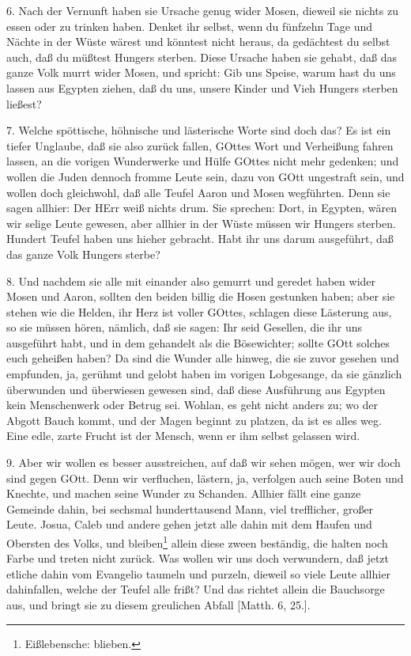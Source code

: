 6. Nach der Vernunft haben sie Ursache genug wider Mosen, dieweil sie nichts zu essen oder zu trinken haben. Denket ihr selbst, wenn du fünfzehn Tage und Nächte in der Wüste wärest und könntest nicht heraus, da gedächtest du selbst auch, daß du müßtest Hungers sterben. Diese Ursache haben sie gehabt, daß das ganze Volk murrt wider Mosen, und spricht: Gib uns Speise, warum hast du uns lassen aus Egypten ziehen, daß du uns, unsere Kinder und Vieh Hungers sterben ließest?

7. Welche spöttische, höhnische und lästerische Worte sind doch das? Es ist ein tiefer Unglaube, daß sie also zurück fallen, GOttes Wort und Verheißung fahren lassen, an die vorigen Wunderwerke und Hülfe GOttes nicht mehr gedenken; und wollen die Juden dennoch fromme Leute sein, dazu von GOtt ungestraft sein, und wollen doch gleichwohl, daß alle Teufel Aaron und Mosen wegführten. Denn sie sagen allhier: Der HErr weiß nichts drum. Sie sprechen: Dort, in Egypten, wären wir selige Leute gewesen, aber allhier in der Wüste müssen wir Hungers sterben. Hundert Teufel haben uns hieher gebracht. Habt ihr uns darum ausgeführt, daß das ganze Volk Hungers sterbe?

8. Und nachdem sie alle mit einander also gemurrt und geredet haben wider Mosen und Aaron, sollten den beiden billig die Hosen gestunken haben; aber sie stehen wie die Helden, ihr Herz ist voller GOttes, schlagen diese Lästerung aus, so sie müssen hören, nämlich, daß sie sagen: Ihr seid Gesellen, die ihr uns ausgeführt habt, und in dem gehandelt als die Bösewichter; sollte GOtt solches euch geheißen haben? Da sind die Wunder alle hinweg, die sie zuvor gesehen und empfunden, ja, gerühmt und gelobt haben im vorigen Lobgesange, da sie gänzlich überwunden und überwiesen gewesen sind, daß diese Ausführung aus Egypten kein Menschenwerk oder Betrug sei. Wohlan, es geht nicht anders zu; wo der Abgott Bauch kommt, und der Magen beginnt zu platzen, da ist es alles weg. Eine edle, zarte Frucht ist der Mensch, wenn er ihm selbst gelassen wird.

9. Aber wir wollen es besser ausstreichen, auf daß wir sehen mögen, wer wir doch sind gegen GOtt. Denn wir verfluchen, lästern, ja, verfolgen auch seine Boten und Knechte, und machen seine Wunder zu Schanden. Allhier fällt eine ganze Gemeinde dahin, bei sechsmal hunderttausend Mann, viel trefflicher, großer Leute. Josua, Caleb und andere gehen jetzt alle dahin mit dem Haufen und Obersten des Volks, und bleiben\footnote{Eißlebensche: blieben.} allein diese zween beständig, die halten noch Farbe und treten nicht zurück. Was wollen wir uns doch verwundern, daß jetzt etliche dahin vom Evangelio taumeln und purzeln, dieweil so viele Leute allhier dahinfallen, welche der Teufel alle frißt? Und das richtet allein die Bauchsorge aus, und bringt sie zu diesem greulichen Abfall [Matth. 6, 25.].

